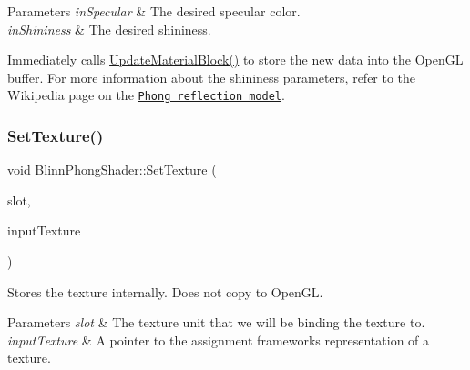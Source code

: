 \begin{DoxyParams}{Parameters}
{\em in\+Specular} & The desired specular color. \\
\hline
{\em in\+Shininess} & The desired shininess.\\
\hline
\end{DoxyParams}
Immediately calls \hyperlink{class_blinn_phong_shader_aa247270120b46431b436220ea6e777be}{Update\+Material\+Block()} to store the new data into the Open\+GL buffer. For more information about the shininess parameters, refer to the Wikipedia page on the \href{https://en.wikipedia.org/wiki/Phong_reflection_model}{\tt Phong reflection model}. \hypertarget{class_blinn_phong_shader_aa9c8908b300ce1451887945fb961d3b2}{}\label{class_blinn_phong_shader_aa9c8908b300ce1451887945fb961d3b2}
\subsubsection{\texorpdfstring{Set\+Texture()}{SetTexture()}}
{\footnotesize\ttfamily void Blinn\+Phong\+Shader\+::\+Set\+Texture (\begin{DoxyParamCaption}\item[{\hyperlink{struct_blinn_phong_shader_1_1_texture_slots_a98940b49ba855ee47d61a6243c05c34d}{Texture\+Slots\+::\+Type}}]{slot,  }\item[{std\+::shared\+\_\+ptr$<$ class \hyperlink{class_texture}{Texture} $>$}]{input\+Texture }\end{DoxyParamCaption})\hspace{0.3cm}{\ttfamily [virtual]}}



Stores the texture internally. Does not copy to Open\+GL.


\begin{DoxyParams}{Parameters}
{\em slot} & The texture unit that we will be binding the texture to. \\
\hline
{\em input\+Texture} & A pointer to the assignment framework\textquotesingle{}s representation of a texture. \\
\hline
\end{DoxyParams}
\hypertarget{class_blinn_phong_shader_ab4d435ed4f4815a71590b514550dc2b7}{}\label{class_blinn_phong_shader_ab4d435ed4f4815a71590b514550dc2b7}
